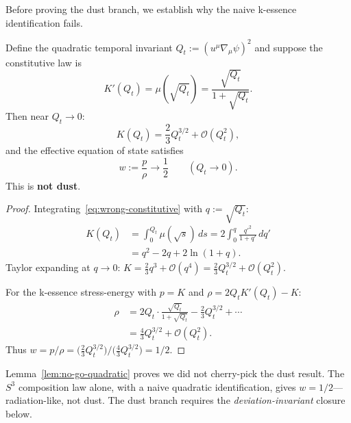 Before proving the dust branch, we establish why the naive k-essence identification fails.

\begin{lemma}\label{lem:no-go-quadratic}
Define the quadratic temporal invariant $Q_t := (u^\mu\nabla_\mu\psi)^2$ and suppose the constitutive law is
\begin{equation}
K'(Q_t) = \mu(\sqrt{Q_t}) = \frac{\sqrt{Q_t}}{1+\sqrt{Q_t}}.
\label{eq:wrong-constitutive}
\end{equation}
Then near $Q_t \to 0$:
\begin{equation}
K(Q_t) = \frac{2}{3}Q_t^{3/2} + \mathcal{O}(Q_t^2),
\label{eq:K-wrong-expansion}
\end{equation}
and the effective equation of state satisfies
\begin{equation}
w := \frac{p}{\rho} \to \frac{1}{2} \qquad (Q_t \to 0).
\label{eq:w-half}
\end{equation}
This is \textbf{not dust}.
\end{lemma}

\begin{proof}
Integrating~\eqref{eq:wrong-constitutive} with $q := \sqrt{Q_t}$:
\begin{align*}
K(Q_t) &= \int_0^{Q_t} \!\mu(\sqrt{s})\,ds = 2\int_0^q \frac{q'^2}{1+q'}\,dq' \\
&= q^2 - 2q + 2\ln(1+q).
\end{align*}
Taylor expanding at $q \to 0$: $K = \frac{2}{3}q^3 + \mathcal{O}(q^4) = \frac{2}{3}Q_t^{3/2} + \mathcal{O}(Q_t^2)$.

For the k-essence stress-energy with $p = K$ and $\rho = 2Q_t K'(Q_t) - K$:
\begin{align*}
\rho &= 2Q_t \cdot \frac{\sqrt{Q_t}}{1+\sqrt{Q_t}} - \frac{2}{3}Q_t^{3/2} + \cdots \\
&= \frac{4}{3}Q_t^{3/2} + \mathcal{O}(Q_t^2).
\end{align*}
Thus $w = p/\rho = \bigl(\frac{2}{3}Q_t^{3/2}\bigr)\big/\bigl(\frac{4}{3}Q_t^{3/2}\bigr) = 1/2$.
\end{proof}

\begin{remark}
Lemma~\ref{lem:no-go-quadratic} proves we did not cherry-pick the dust result. The $S^3$ composition law alone, with a naive quadratic identification, gives $w = 1/2$---radiation-like, not dust. The dust branch requires the \emph{deviation-invariant} closure below.
\end{remark}

